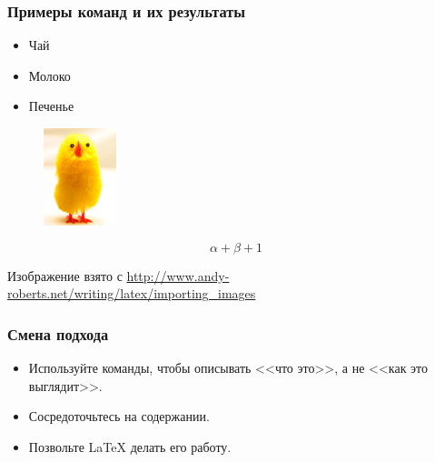 \documentclass{beamer}
\begin{document}
\begin{frame}[fragile]
\frametitle{Примеры команд и их результаты}
\vspace{-0.5mm}
\begin{exampletwoup}
\begin{itemize}
\item Чай
\item Молоко
\item Печенье
\end{itemize}
\end{exampletwoup}
\vspace{-0.5mm}
\begin{exampletwoup}
\begin{figure}
\includegraphics{chick}
\end{figure}
\end{exampletwoup}
\vspace{-0.5mm}
\begin{exampletwoup}
\begin{equation}
\alpha + \beta + 1
\end{equation}
\end{exampletwoup}
\vspace{-3mm}
\tiny{Изображение взято с \url{http://www.andy-roberts.net/writing/latex/importing_images}}
\end{frame}

\begin{frame}[fragile]
\frametitle{Смена подхода}
\begin{itemize}
\item Используйте команды, чтобы описывать <<что это>>, а не <<как это выглядит>>.
\item Сосредоточьтесь на содержании.
\item Позвольте \LaTeX{} делать его работу.
\end{itemize}
\end{frame}
\end{document}
